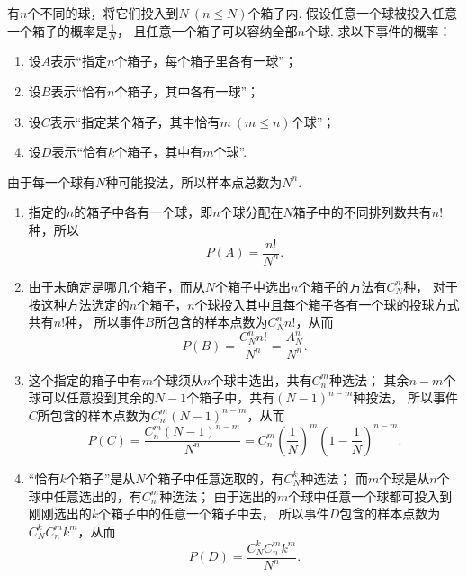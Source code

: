 \begin{example}[投球问题]\label{example:概率论基础.古典概型.投球问题}
有\(n\)个不同的球，将它们投入到\(N\ (n \leq N)\)个箱子内.
假设任意一个球被投入任意一个箱子的概率是\(\frac{1}{N}\)，
且任意一个箱子可以容纳全部\(n\)个球.
求以下事件的概率：
\begin{enumerate}
	\item 设\(A\)表示“指定\(n\)个箱子，每个箱子里各有一球”；
	\item 设\(B\)表示“恰有\(n\)个箱子，其中各有一球”；
	\item 设\(C\)表示“指定某个箱子，其中恰有\(m\ (m \leq n)\)个球”；
	\item 设\(D\)表示“恰有\(k\)个箱子，其中有\(m\)个球”.
\end{enumerate}
\begin{solution}
由于每一个球有\(N\)种可能投法，所以样本点总数为\(N^n\).
\begin{enumerate}
	\item
	指定的\(n\)的箱子中各有一个球，即\(n\)个球分配在\(N\)箱子中的不同排列数共有\(n!\)种，所以\begin{equation*}
		P(A) = \frac{n!}{N^n}.
	\end{equation*}

	\item
	由于未确定是哪几个箱子，而从\(N\)个箱子中选出\(n\)个箱子的方法有\(C_N^n\)种，
	对于按这种方法选定的\(n\)个箱子，\(n\)个球投入其中且每个箱子各有一个球的投球方式共有\(n!\)种，
	所以事件\(B\)所包含的样本点数为\(C_N^n n!\)，从而\begin{equation*}
		P(B) = \frac{C_N^n n!}{N^n} = \frac{A_N^n}{N^n}.
	\end{equation*}

	\item
	这个指定的箱子中有\(m\)个球须从\(n\)个球中选出，共有\(C_n^m\)种选法；
	其余\(n-m\)个球可以任意投到其余的\(N-1\)个箱子中，共有\((N-1)^{n-m}\)种投法，
	所以事件\(C\)所包含的样本点数为\(C_n^m (N-1)^{n-m}\)，从而\begin{equation*}
		P(C) = \frac{C_n^m (N-1)^{n-m}}{N^n}
		= C_n^m \left(\frac{1}{N}\right)^m \left(1-\frac{1}{N}\right)^{n-m}.
	\end{equation*}

	\item
	“恰有\(k\)个箱子”是从\(N\)个箱子中任意选取的，有\(C_N^k\)种选法；
	而\(m\)个球是从\(n\)个球中任意选出的，有\(C_n^m\)种选法；
	由于选出的\(m\)个球中任意一个球都可投入到刚刚选出的\(k\)个箱子中的任意一个箱子中去，
	所以事件\(D\)包含的样本点数为\(C_N^k C_n^m k^m\)，从而\begin{equation*}
		P(D) = \frac{C_N^k C_n^m k^m}{N^n}.
	\end{equation*}
\end{enumerate}
\end{solution}
\end{example}

